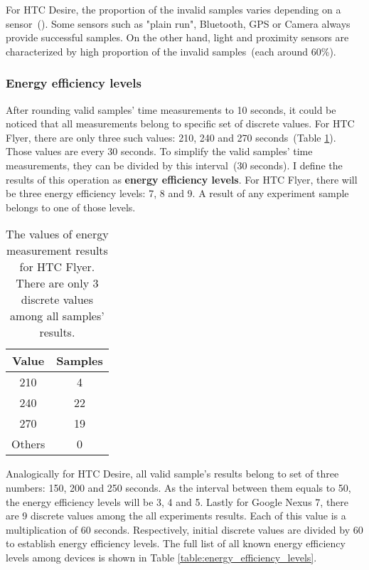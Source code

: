 
For HTC Desire, the proportion of the invalid samples varies depending on a sensor\ (). Some sensors such as "plain run", Bluetooth, GPS or Camera always provide successful samples. On the other hand, light and proximity sensors are characterized by high proportion of the invalid samples\ (each around 60\%). 



\subsubsection{Energy efficiency levels}
\hspace{10pt} After rounding valid samples' time measurements to 10 seconds, it could be noticed that all measurements belong to specific set of discrete values. For HTC Flyer, there are only three such values: 210, 240 and 270 seconds\ (Table \ref{table:discretevalues}). Those values are every 30 seconds. To simplify the valid samples' time measurements, they can be divided by this interval\ (30 seconds). I define the results of this operation as \textbf{energy efficiency levels}. For HTC Flyer, there will be three energy efficiency levels: 7, 8 and 9. A result of any experiment sample belongs to one of those levels. 
			
\begin{table}[H]
\centering
    \begin{tabular}{| c | c |}
    \hline
    	Value & Samples \\ \hline
    	210 & 4 \\ \hline
    	240 & 22 \\ \hline
    	270 & 19 \\ \hline
    	Others & 0 \\ \hline
    \end{tabular}
    \caption{The values of energy measurement results for HTC Flyer. There are only 3 discrete values among all samples' results.}
	\label{table:discretevalues}
\end{table}
			
Analogically for HTC Desire, all valid sample's results belong to set of three numbers: 150, 200 and 250 seconds. As the interval between them equals to 50, the energy efficiency levels will be 3, 4 and 5. Lastly for Google Nexus 7, there are 9 discrete values among the all experiments results. Each of this value is a multiplication of 60 seconds. Respectively, initial discrete values are divided by 60 to establish energy efficiency levels. The full list of all known energy efficiency levels among devices is shown in Table \ref{table:energy_efficiency_levels}.
		
